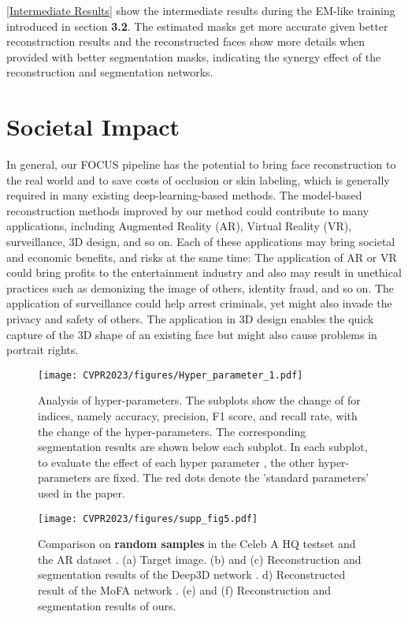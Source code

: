 \documentclass[10pt,twocolumn,letterpaper]{article}
\begin{document}
\cref{Intermediate Results} show the intermediate results during the EM-like training introduced in section \textbf{3.2}. 
The estimated masks get more accurate given better reconstruction results and the reconstructed faces show more details when provided with better segmentation masks, indicating the synergy effect of the reconstruction and segmentation networks.


\section{Societal Impact}
In general, our FOCUS pipeline has the potential to bring face reconstruction to the real world and to save costs of occlusion or skin labeling, which is generally required in many existing deep-learning-based methods.
The model-based reconstruction methods improved by our method could contribute to many applications, including Augmented Reality (AR), Virtual Reality (VR), surveillance, 3D design, and so on. Each of these applications may bring societal and economic benefits, and risks at the same time: The application of AR or VR could bring profits to the entertainment industry and also may result in unethical practices such as demonizing the image of others, identity fraud, and so on. The application of surveillance could help arrest criminals, yet might also invade the privacy and safety of others. The application in 3D design enables the quick capture of the 3D shape of an existing face but might also cause problems in portrait rights. 


\begin{figure*}
  \centering
  \texttt{[image: CVPR2023/figures/Hyper\_parameter\_1.pdf]}
  

    \caption{Analysis of hyper-parameters. The subplots show the change of for indices, namely accuracy, precision, F1 score, and recall rate, with the change of the hyper-parameters. The corresponding segmentation results are shown below each subplot. In each subplot, to evaluate the effect of each hyper parameter , the other hyper-parameters  are fixed. The red dots denote the 'standard parameters' used in the paper.}
 \label{Analysis: Hyper-parameters}
\end{figure*}



\begin{figure*}
  \centering  
  \texttt{[image: CVPR2023/figures/supp\_fig5.pdf]}
  \caption{Comparison on \textbf{random samples} in the Celeb A HQ \cite{CELEBAHQ} testset and the AR dataset \cite{ARdataset}. (a) Target image. (b) and (c) Reconstruction and segmentation results of the Deep3D network \cite{deng2019accurate}. d) Reconstructed result of the MoFA network \cite{tewari2017mofa}. (e) and (f) Reconstruction and segmentation results of ours.}
 \label{Visual Comparison:general}
\end{figure*}
\end{document}
